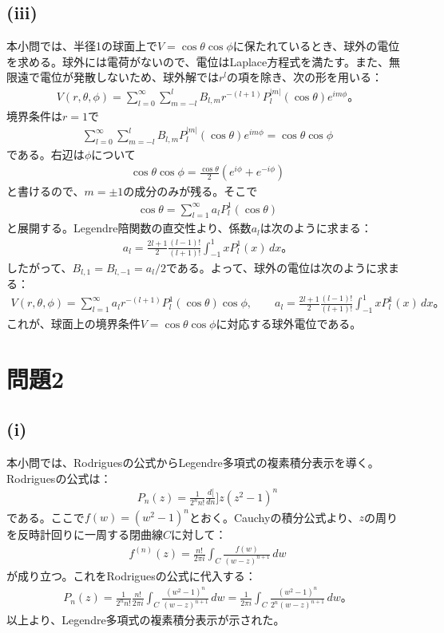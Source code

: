 \documentclass[platex,dvipdfmx,a4paper]{jsarticle}
\newcommand{\bbn}[2]{\frac{d #1}{d #2}}
\newcommand{\ssum}[3]{\sum_{#1=#2}^#3}
\begin{document}
  \subsection*{(iii)}
  本小問では、半径1の球面上で$V=\cos\theta\cos\phi$に保たれているとき、球外の電位を求める。球外には電荷がないので、電位はLaplace方程式を満たす。また、無限遠で電位が発散しないため、球外解では$r^l$の項を除き、次の形を用いる：
  \begin{align*}
    V(r,\theta,\phi)=\ssum{l}{0}{\infty}\ssum{m}{-l}{l}B_{l,m}r^{-(l+1)}P_l^{|m|}(\cos\theta)e^{im\phi}。
  \end{align*}
  境界条件は$r=1$で
  \begin{align*}
    \ssum{l}{0}{\infty}\ssum{m}{-l}{l}B_{l,m}P_l^{|m|}(\cos\theta)e^{im\phi}=\cos\theta\cos\phi
  \end{align*}
  である。右辺は$\phi$について
  \begin{align*}
    \cos\theta\cos\phi=\frac{\cos\theta}{2}\left(e^{i\phi}+e^{-i\phi}\right)
  \end{align*}
  と書けるので、$m=\pm1$の成分のみが残る。そこで
  \begin{align*}
    \cos\theta=\ssum{l}{1}{\infty}a_lP_l^1(\cos\theta)
  \end{align*}
  と展開する。Legendre陪関数の直交性より、係数$a_l$は次のように求まる：
  \begin{align*}
    a_l=\frac{2l+1}{2}\frac{(l-1)!}{(l+1)!}\int_{-1}^{1}xP_l^1(x)\,dx。
  \end{align*}
  したがって、$B_{l,1}=B_{l,-1}=a_l/2$である。よって、球外の電位は次のように求まる：
  \begin{align*}
    V(r,\theta,\phi)=\ssum{l}{1}{\infty}a_l r^{-(l+1)}P_l^1(\cos\theta)\cos\phi,\qquad a_l=\frac{2l+1}{2}\frac{(l-1)!}{(l+1)!}\int_{-1}^{1}xP_l^1(x)\,dx。
  \end{align*}
  これが、球面上の境界条件$V=\cos\theta\cos\phi$に対応する球外電位である。
  
  \section{問題2}
  
  \subsection*{(i)}
  本小問では、Rodriguesの公式からLegendre多項式の複素積分表示を導く。Rodriguesの公式は：
  \begin{align*}
    P_n(z)=\frac{1}{2^n n!}\bbn[n]{}{z}(z^2-1)^n
  \end{align*}
  である。ここで$f(w)=(w^2-1)^n$とおく。Cauchyの積分公式より、$z$の周りを反時計回りに一周する閉曲線$C$に対して：
  \begin{align*}
    f^{(n)}(z)=\frac{n!}{2\pi i}\int_C\frac{f(w)}{(w-z)^{n+1}}\,dw
  \end{align*}
  が成り立つ。これをRodriguesの公式に代入する：
  \begin{align*}
    P_n(z)=\frac{1}{2^n n!}\frac{n!}{2\pi i}\int_C\frac{(w^2-1)^n}{(w-z)^{n+1}}\,dw=\frac{1}{2\pi i}\int_C\frac{(w^2-1)^n}{2^n(w-z)^{n+1}}\,dw。
  \end{align*}
  以上より、Legendre多項式の複素積分表示が示された。
  
\end{document}
